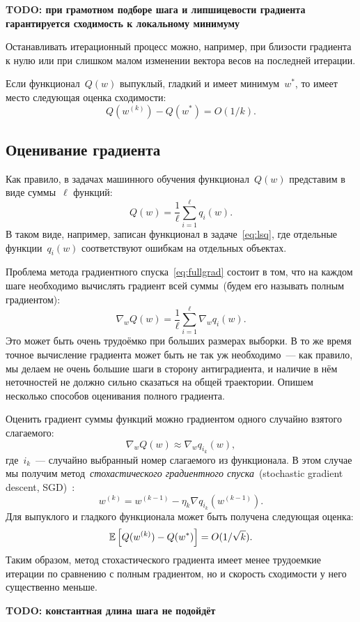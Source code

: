 \documentclass[12pt,fleqn]{article}
\begin{document}
\textbf{TODO: при грамотном подборе шага и липшицевости градиента гарантируется сходимость к локальному минимуму}

Останавливать итерационный процесс можно, например, при близости градиента к нулю
или при слишком малом изменении вектора весов на последней итерации.

Если функционал~$Q(w)$ выпуклый, гладкий и имеет минимум~$w^*$,
то имеет место следующая оценка сходимости:
\[
    Q(w^{(k)}) - Q(w^*)
    =
    O(1 / k).
\]

\subsection{Оценивание градиента}

Как правило, в задачах машинного обучения функционал~$Q(w)$ представим в виде суммы~$\ell$ функций:
\[
    Q(w)
    =
    \frac{1}{\ell}
    \sum_{i = 1}^{\ell}
        q_i(w).
\]
В таком виде, например, записан функционал в задаче~\eqref{eq:lsq},
где отдельные функции~$q_i(w)$ соответствуют ошибкам на отдельных объектах.

Проблема метода градиентного спуска~\eqref{eq:fullgrad} состоит в том,
что на каждом шаге необходимо вычислять градиент всей суммы~(будем его называть полным градиентом):
\[
    \nabla_w Q(w)
    =
    \frac{1}{\ell}
    \sum_{i = 1}^{\ell}
        \nabla_w q_i(w).
\]
Это может быть очень трудоёмко при больших размерах выборки.
В то же время точное вычисление градиента может быть не так уж необходимо~---
как правило, мы делаем не очень большие шаги в сторону антиградиента,
и наличие в нём неточностей не должно сильно сказаться на общей траектории.
Опишем несколько способов оценивания полного градиента.

Оценить градиент суммы функций можно градиентом одного случайно взятого слагаемого:
\[
    \nabla_w Q(w)
    \approx
    \nabla_w q_{i_k}(w),
\]
где~$i_k$~--- случайно выбранный номер слагаемого из функционала.
В этом случае мы получим метод~\emph{стохастического
градиентного спуска}~(stochastic gradient descent, SGD)~\cite{robbins51stochastic}:
\[
    w^{(k)} = w^{(k - 1)} - \eta_k \nabla q_{i_k}(w^{(k - 1)}).
\]
Для выпуклого и гладкого функционала может быть получена
следующая оценка:
\[
    \mathbb{E} \left[
        Q(w^{(k)}) - Q(w^*)
    \right]
    =
    O(1 / \sqrt{k}).
\]
Таким образом, метод стохастического градиента имеет менее
трудоемкие итерации по сравнению с полным градиентом,
но и скорость сходимости у него существенно меньше.

\textbf{TODO: константная длина шага не подойдёт}
\end{document}
